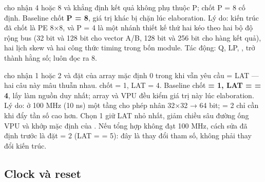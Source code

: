 \begin{notebox}
 cho  nhận 4 hoặc 8 và khẳng định kết quả không phụ thuộc P;
 chốt P = 8 cố định. Baseline chốt \textbf{P = 8}, giá trị khác bị chặn lúc elaboration.
Lý do: kiến trúc đã chốt là PE 8×8, và P = 4 là một nhánh thiết kế thứ hai kéo theo hai bộ độ rộng
bus (32 bit và 128 bit cho vector A/B, 128 bit và 256 bit cho hàng kết quả), hai lịch skew và hai
công thức timing trong bốn module. Tác động: Q, LP, ,  trở
thành hằng số;  luôn đọc ra 8.
\end{notebox}

\begin{notebox}
 cho  nhận 1 hoặc 2 và đặt  của array mặc định 0 trong khi
vẫn yêu cầu  = LAT — hai câu này mâu thuẫn nhau.  chốt  = 1,
LAT = 4. Baseline chốt \textbf{ = 1, LAT =  = 4}, lấy
 làm nguồn duy nhất; array và VPU đều kiểm giá trị này lúc elaboration.
Lý do: ở 100 MHz (10 ns) một tầng cho phép nhân 32×32 → 64 bit;  = 2 chỉ cần khi
đẩy tần số cao hơn. Chọn 1 giữ LAT nhỏ nhất, giảm chiều sâu đường ống VPU và khớp mặc định của
. Nếu tổng hợp không đạt 100 MHz, cách sửa đã định trước là đặt  = 2
(LAT =  = 5): đây là thay đổi tham số, không phải thay đổi kiến trúc.
\end{notebox}

\subsection{Clock và reset}\label{sec:1.6}

